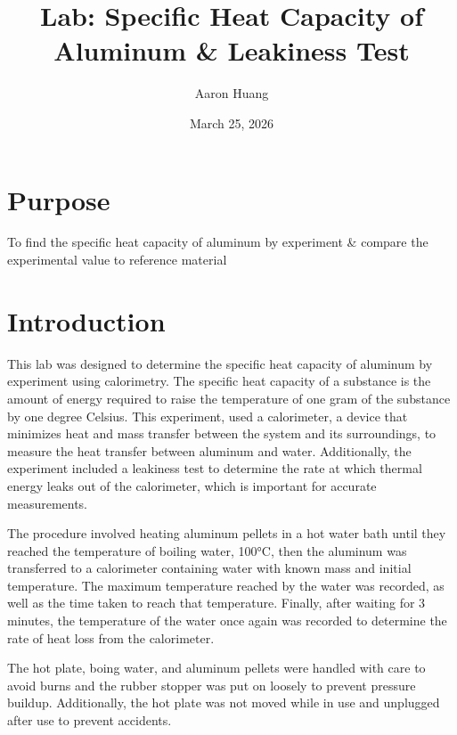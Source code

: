 \documentclass{article}
\begin{document}
\title{Lab: Specific Heat Capacity of Aluminum \& Leakiness Test}
\author{Aaron Huang}
\date{March 25, 2026}
\maketitle
\section{Purpose}
To find the specific heat capacity of aluminum by experiment \& compare the experimental value to reference material
\section{Introduction}
This lab was designed to determine the specific heat capacity of aluminum by experiment using calorimetry. The specific heat capacity of a substance is the amount of energy required to raise the temperature of one gram of the substance by one degree Celsius. This experiment, used a calorimeter, a device that minimizes heat and mass transfer between the system and its surroundings, to measure the heat transfer between aluminum and water. Additionally, the experiment included a leakiness test to determine the rate at which thermal energy leaks out of the calorimeter, which is important for accurate measurements.

The procedure involved heating aluminum pellets in a hot water bath until they reached the temperature of boiling water, 100°C, then the aluminum was transferred to a calorimeter containing water with known mass and initial temperature. The maximum temperature reached by the water was recorded, as well as the time taken to reach that temperature. Finally, after waiting for 3 minutes, the temperature of the water once again was recorded to determine the rate of heat loss from the calorimeter. 

The hot plate, boing water, and aluminum pellets were handled with care to avoid burns and the rubber stopper was put on loosely to prevent pressure buildup. Additionally, the hot plate was not moved while in use and unplugged after use to prevent accidents.
\end{document}
